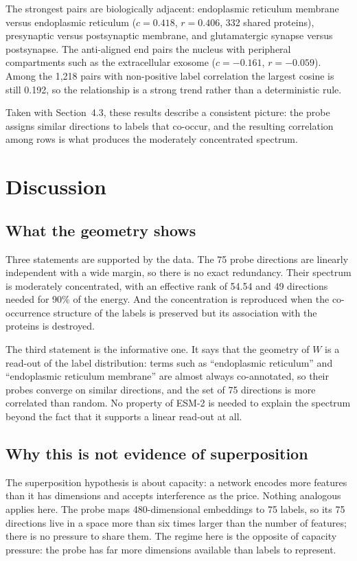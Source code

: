 \documentclass[11pt,a4paper]{article}
\begin{document}
The strongest pairs are biologically adjacent: endoplasmic reticulum membrane
versus endoplasmic reticulum ($c = 0.418$, $r = 0.406$, 332 shared proteins),
presynaptic versus postsynaptic membrane, and glutamatergic synapse versus
postsynapse. The anti-aligned end pairs the nucleus with peripheral compartments
such as the extracellular exosome ($c = -0.161$, $r = -0.059$). Among the 1,218
pairs with non-positive label correlation the largest cosine is still 0.192, so the
relationship is a strong trend rather than a deterministic rule.

Taken with Section~4.3, these results describe a consistent picture: the probe
assigns similar directions to labels that co-occur, and the resulting correlation
among rows is what produces the moderately concentrated spectrum.

\section{Discussion}

\subsection{What the geometry shows}

Three statements are supported by the data. The 75 probe directions are linearly
independent with a wide margin, so there is no exact redundancy. Their spectrum is
moderately concentrated, with an effective rank of 54.54 and 49 directions needed
for 90\% of the energy. And the concentration is reproduced when the co-occurrence
structure of the labels is preserved but its association with the proteins is
destroyed.

The third statement is the informative one. It says that the geometry of $W$ is a
read-out of the label distribution: terms such as ``endoplasmic reticulum'' and
``endoplasmic reticulum membrane'' are almost always co-annotated, so their probes
converge on similar directions, and the set of 75 directions is more correlated
than random. No property of ESM-2 is needed to explain the spectrum beyond the
fact that it supports a linear read-out at all.

\subsection{Why this is not evidence of superposition}

The superposition hypothesis \cite{elhage2022toy} is about capacity: a network
encodes more features than it has dimensions and accepts interference as the
price. Nothing analogous applies here. The probe maps 480-dimensional embeddings to
75 labels, so its 75 directions live in a space more than six times larger than the
number of features; there is no pressure to share them. The regime here is the
opposite of capacity pressure: the probe has far more dimensions available than
labels to represent.
\end{document}
